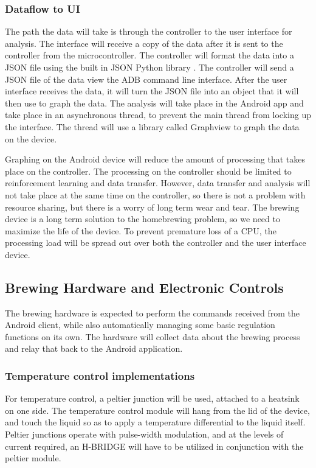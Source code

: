 \documentclass[draftclsnofoot,onecolumn,letterpaper,10pt]{IEEEtran}
\begin{document}
\subsubsection{Dataflow to UI}
The path the data will take is through the controller to the user interface for analysis.
The interface will receive a copy of the data after it is sent to the controller from the microcontroller.
The controller will format the data into a JSON file using the built in JSON Python library \cite{JSONPython}.
The controller will send a JSON file of the data view the ADB command line interface.
After the user interface receives the data, it will turn the JSON file into an object that it will then use to graph the data.
The analysis will take place in the Android app and take place in an asynchronous thread, to prevent the main thread from locking up the interface.
The thread will use a library called Graphview to graph the data on the device. \cite{Graphview}

Graphing on the Android device will reduce the amount of processing that takes place on the controller.
The processing on the controller should be limited to reinforcement learning and data transfer.
However, data transfer and analysis will not take place at the same time on the controller, so there is not a problem with resource sharing, but there is a worry of long term wear and tear.
The brewing device is a long term solution to the homebrewing problem, so we need to maximize the life of the device.
To prevent premature loss of a CPU, the processing load will be spread out over both the controller and the user interface device.

\subsection{Brewing Hardware and Electronic Controls}\label{sec:hardware}%
The brewing hardware is expected to perform the commands received from the Android client, while also automatically managing
some basic regulation functions on its own. The hardware will collect data about the brewing process and relay that back to the
Android application.

\subsubsection{Temperature control implementations}
For temperature control, a peltier junction will be used, attached to a heatsink on one side. The temperature control module will
hang from the lid of the device, and touch the liquid so as to apply a temperature differential to the liquid itself. Peltier junctions 
operate with pulse-width modulation, and at the levels of current required, an H-BRIDGE will have to be utilized in conjunction with the 
peltier module.
\end{document}
